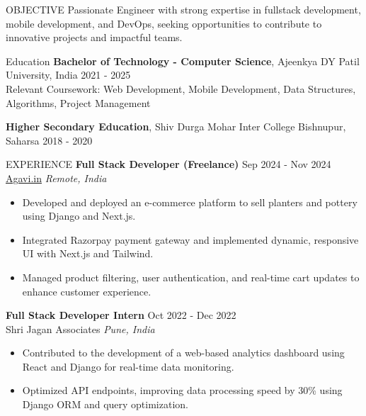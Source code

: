 \documentclass{style} %
\begin{document}

\begin{rSection}{OBJECTIVE}
{Passionate Engineer with strong expertise in fullstack development, mobile development, and DevOps, seeking opportunities to contribute to innovative projects and impactful teams.}
\end{rSection}


\begin{rSection}{Education}
{\bf Bachelor of Technology - Computer Science}, Ajeenkya DY Patil University, India \hfill {2021 - 2025}\\
Relevant Coursework: Web Development, Mobile Development, Data Structures, Algorithms, Project Management

\vspace{0.5em} %

{\bf Higher Secondary Education}, Shiv Durga Mohar Inter College Bishnupur, Saharsa \hfill {2018 - 2020}
\end{rSection}



\begin{rSection}{EXPERIENCE}
\textbf{Full Stack Developer (Freelance)} \hfill Sep 2024 - Nov 2024\\
\href{https://agavi.in}{Agavi.in} \hfill \textit{Remote, India}
 \begin{itemize}
    \itemsep -3pt {} 
     \item Developed and deployed an e-commerce platform to sell planters and pottery using Django and Next.js.
     \item Integrated Razorpay payment gateway and implemented dynamic, responsive UI with Next.js and Tailwind.
     \item Managed product filtering, user authentication, and real-time cart updates to enhance customer experience.
 \end{itemize}
 
\textbf{Full Stack Developer Intern} \hfill Oct 2022 - Dec 2022\\
Shri Jagan Associates \hfill \textit{Pune, India}
 \begin{itemize}
    \itemsep -3pt {} 
     \item Contributed to the development of a web-based analytics dashboard using React and Django for real-time data monitoring.
     \item Optimized API endpoints, improving data processing speed by 30\% using Django ORM and query optimization.
 \end{itemize}
\end{rSection} 
\end{document}
